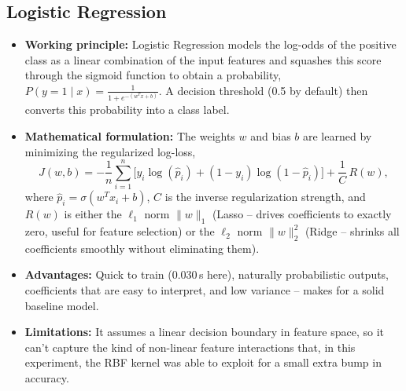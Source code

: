 \documentclass[12pt,a4paper]{article}
\begin{document}
\subsection*{Logistic Regression}
\begin{itemize}
\item \textbf{Working principle:} Logistic Regression models the log-odds of the
positive class as a linear combination of the input features and squashes this score
through the sigmoid function to obtain a probability, $P(y=1\mid x) = \frac{1}{1 +
e^{-(w^Tx+b)}}$. A decision threshold (0.5 by default) then converts this probability
into a class label.
\item \textbf{Mathematical formulation:} The weights $w$ and bias $b$ are learned by
minimizing the regularized log-loss,
\[
J(w,b) = -\frac{1}{n}\sum_{i=1}^{n}\Big[y_i\log(\hat{p}_i) + (1-y_i)\log(1-\hat{p}_i)\Big]
+ \frac{1}{C}\,R(w),
\]
where $\hat p_i = \sigma(w^Tx_i+b)$, $C$ is the inverse regularization strength, and
$R(w)$ is either the $\ell_1$ norm $\lVert w \rVert_1$ (Lasso -- drives coefficients to
exactly zero, useful for feature selection) or the $\ell_2$ norm $\lVert w \rVert_2^2$
(Ridge -- shrinks all coefficients smoothly without eliminating them).
\item \textbf{Advantages:} Quick to train (0.030\,s here), naturally probabilistic
outputs, coefficients that are easy to interpret, and low variance -- makes for a
solid baseline model.
\item \textbf{Limitations:} It assumes a linear decision boundary in feature space, so
it can't capture the kind of non-linear feature interactions that, in this
experiment, the RBF kernel was able to exploit for a small extra bump in accuracy.
\end{itemize}
 
\end{document}
